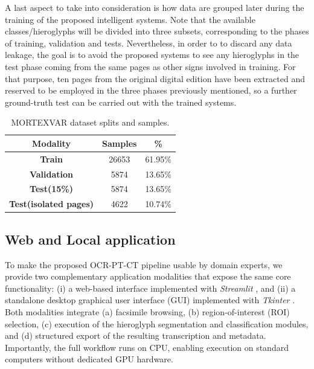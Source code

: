 \documentclass[10pt,onecolumn,letterpaper]{article}
\begin{document}
A last aspect to take into consideration is how data are grouped later during the training of the proposed intelligent systems. Note that the available classes/hieroglyphs will be divided into three subsets, corresponding to the phases of training, validation and tests. Nevertheless, in order to to discard any data leakage, the goal is to avoid the proposed systems to see any hieroglyphs in the test phase coming from the same pages as other signs involved in training. For that purpose, ten pages from the original digital edition \cite{Buck61} have been extracted and reserved to be employed in the three phases previously mentioned, so a further ground-truth test can be carried out with the trained systems.



\begin{table}[]
	\caption{MORTEXVAR dataset splits and samples.}
	\centering
	\begin{tabular}{|c|c|c|}
		\hline
		\textbf{Modality}             & \textbf{Samples} & \textbf{\%} \\ \hline
		\textbf{Train}                & 26653            & 61.95\%     \\ \hline
		\textbf{Validation}           & 5874             & 13.65\%     \\ \hline
		\textbf{Test(15\%)}           & 5874             & 13.65\%     \\ \hline
		\textbf{Test(isolated pages)} & 4622             & 10.74\%     \\ \hline
	\end{tabular}
	\label{tab:dataset}
\end{table}

\subsection{Web and Local application}

To make the proposed OCR-PT-CT pipeline usable by domain experts, we provide two complementary application modalities that expose the same core functionality: (i) a web-based interface implemented with \textit{Streamlit} \cite{streamlit2025}, and (ii) a standalone desktop graphical user interface (GUI) implemented with \textit{Tkinter} \cite{lundh1999introduction}. Both modalities integrate (a) facsimile browsing, (b) region-of-interest (ROI) selection, (c) execution of the hieroglyph segmentation and classification modules, and (d) structured export of the resulting transcription and metadata. Importantly, the full workflow runs on CPU, enabling execution on standard computers without dedicated GPU hardware.
\end{document}
